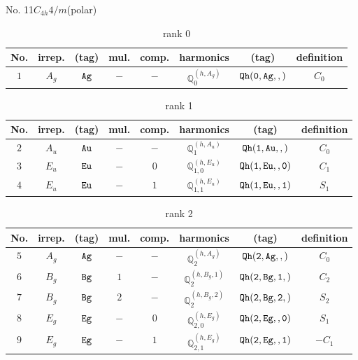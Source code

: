 \documentclass[fleqn,8pt]{jsarticle}
\begin{document}
\setcounter{MaxMatrixCols}{16}

\begin{center}
\LARGE
No. 11\quad$C_{4h}$\quad$4/m$\quad[ tetragonal ] (polar)
\end{center}
\begin{table}[ht!]
\begin{center}
\caption{rank 0}
\renewcommand{\arraystretch}{1.3}
\begin{tabular}{cccccccc} \hline \hline
No. & irrep. & (tag) & mul. & comp. & harmonics & (tag) & definition \\ \hline
$ 1 $ & $ A_{g} $ & $ {\tt Ag} $ & $ - $ & $ - $ & $ \mathbb{Q}_{0}^{(h,A_{g})} $ & $ {\tt Qh(0,Ag,,)} $ & $ C_{0} $ \\
 \hline \hline
\end{tabular}
\end{center}
\end{table}
\begin{table}[ht!]
\begin{center}
\caption{rank 1}
\renewcommand{\arraystretch}{1.3}
\begin{tabular}{cccccccc} \hline \hline
No. & irrep. & (tag) & mul. & comp. & harmonics & (tag) & definition \\ \hline
$ 2 $ & $ A_{u} $ & $ {\tt Au} $ & $ - $ & $ - $ & $ \mathbb{Q}_{1}^{(h,A_{u})} $ & $ {\tt Qh(1,Au,,)} $ & $ C_{0} $ \\
$ 3 $ & $ E_{u} $ & $ {\tt Eu} $ & $ - $ & $ 0 $ & $ \mathbb{Q}_{1,0}^{(h,E_{u})} $ & $ {\tt Qh(1,Eu,,0)} $ & $ C_{1} $ \\
$ 4 $ & $ E_{u} $ & $ {\tt Eu} $ & $ - $ & $ 1 $ & $ \mathbb{Q}_{1,1}^{(h,E_{u})} $ & $ {\tt Qh(1,Eu,,1)} $ & $ S_{1} $ \\
 \hline \hline
\end{tabular}
\end{center}
\end{table}
\begin{table}[ht!]
\begin{center}
\caption{rank 2}
\renewcommand{\arraystretch}{1.3}
\begin{tabular}{cccccccc} \hline \hline
No. & irrep. & (tag) & mul. & comp. & harmonics & (tag) & definition \\ \hline
$ 5 $ & $ A_{g} $ & $ {\tt Ag} $ & $ - $ & $ - $ & $ \mathbb{Q}_{2}^{(h,A_{g})} $ & $ {\tt Qh(2,Ag,,)} $ & $ C_{0} $ \\
$ 6 $ & $ B_{g} $ & $ {\tt Bg} $ & $ 1 $ & $ - $ & $ \mathbb{Q}_{2}^{(h,B_{g},1)} $ & $ {\tt Qh(2,Bg,1,)} $ & $ C_{2} $ \\
$ 7 $ & $ B_{g} $ & $ {\tt Bg} $ & $ 2 $ & $ - $ & $ \mathbb{Q}_{2}^{(h,B_{g},2)} $ & $ {\tt Qh(2,Bg,2,)} $ & $ S_{2} $ \\
$ 8 $ & $ E_{g} $ & $ {\tt Eg} $ & $ - $ & $ 0 $ & $ \mathbb{Q}_{2,0}^{(h,E_{g})} $ & $ {\tt Qh(2,Eg,,0)} $ & $ S_{1} $ \\
$ 9 $ & $ E_{g} $ & $ {\tt Eg} $ & $ - $ & $ 1 $ & $ \mathbb{Q}_{2,1}^{(h,E_{g})} $ & $ {\tt Qh(2,Eg,,1)} $ & $ - C_{1} $ \\
 \hline \hline
\end{tabular}
\end{center}
\end{table}
\end{document}
